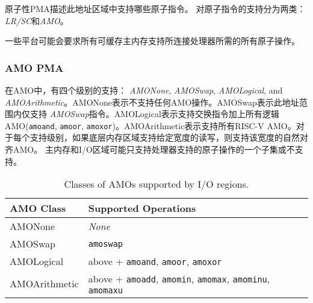 {\iffalse
Atomicity PMAs describes which atomic instructions are supported in
this address region.
Support for atomic instructions is divided into two
categories: {\em LR/SC} and {\em AMOs}.
\fi
原子性PMA描述此地址区域中支持哪些原子指令。
对原子指令的支持分为两类：{\em LR/SC}和{\em AMO}。

\iffalse
\begin{commentary}
Some platforms might mandate that all of cacheable main memory support
all atomic operations required by the attached processors.
\end{commentary}
\fi
\begin{commentary}
一些平台可能会要求所有可缓存主内存支持所连接处理器所需的所有原子操作。
\end{commentary}

\subsubsection{AMO PMA}

\iffalse
  Within AMOs, there are four levels of
support: {\em AMONone}, {\em AMOSwap}, {\em AMOLogical}, and {\em
  AMOArithmetic}.  AMONone indicates that no AMO operations are
supported.  AMOSwap indicates that only {\tt amoswap} instructions are
supported in this address range.  AMOLogical indicates that swap
instructions plus all the logical AMOs ({\tt amoand}, {\tt amoor},
{\tt amoxor}) are supported.  AMOArithmetic indicates that all RISC-V
AMOs are supported.  For each level of support, naturally aligned AMOs
of a given width are supported if the underlying memory region
supports reads and writes of that width.
Main memory and I/O regions may only support a subset or none of the
processor-supported atomic operations.
\fi
在AMO中，有四个级别的支持： {\em AMONone}, {\em AMOSwap}, {\em AMOLogical}, and {\em
AMOArithmetic}。AMONone表示不支持任何AMO操作。AMOSwap表示此地址范围内仅支持 {\em AMOSwap}指令。AMOLogical表示支持交换指令加上所有逻辑AMO({\tt amoand}, {\tt amoor},
{\tt amoxor})。AMOArithmetic表示支持所有RISC-V AMO。对于每个支持级别，如果底层内存区域支持给定宽度的读写，则支持该宽度的自然对齐AMO。
主内存和I/O区域可能只支持处理器支持的原子操作的一个子集或不支持。

\begin{table*}[h!]
\begin{center}
\begin{tabular}{|l|l|}
  \hline
  AMO Class & Supported Operations \\
  \hline
  AMONone       & {\em None} \\
  AMOSwap       & {\tt amoswap} \\
  AMOLogical    & above + {\tt amoand}, {\tt amoor}, {\tt amoxor} \\
  AMOArithmetic & above + {\tt amoadd}, {\tt amomin}, {\tt amomax}, {\tt amominu}, {\tt amomaxu} \\
  \hline
\end{tabular}
\end{center}
\caption{Classes of AMOs supported by I/O regions.}
\label{amoclasses}
\end{table*}

}
